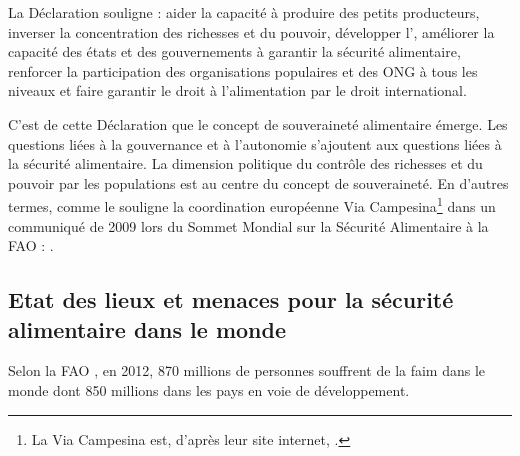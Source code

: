 La Déclaration souligne  : 
aider la capacité à produire des petits producteurs, 
inverser la concentration des richesses et du pouvoir,
développer l'\agec,
améliorer la capacité des états et des gouvernements à garantir la sécurité alimentaire,
renforcer la participation des organisations populaires et des ONG à tous les niveaux
et faire garantir le droit à l'alimentation par le droit international.

C'est de cette Déclaration que le concept de souveraineté alimentaire émerge.
Les questions liées à la gouvernance et à l'autonomie s'ajoutent aux questions liées à la sécurité alimentaire.
La dimension politique du contrôle des richesses et du pouvoir par les populations est au centre du concept de souveraineté.
En d'autres termes, comme le souligne la coordination européenne Via Campesina\footnote{
La Via Campesina est, d'après leur site internet, .} dans un communiqué de 2009 lors du Sommet Mondial sur la Sécurité Alimentaire à la FAO :
.


\subsection{Etat des lieux et menaces pour la sécurité alimentaire dans le monde}
Selon la FAO \cite{fao_letat_2012}, en 2012, 870 millions de personnes souffrent de la faim dans le monde dont 850 millions dans les pays en voie de développement.

